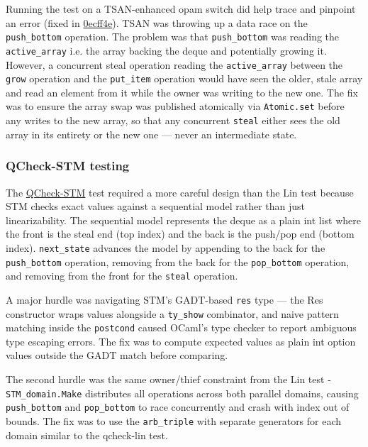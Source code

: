 \documentclass[11pt,a4paper]{article}
\begin{document}
Running the test on a TSAN-enhanced opam switch did help trace and pinpoint
an error (fixed in
\href{https://github.com/alinab/work-steal/commit/0ecff4ee7f97eeefe058dd971ea520606c0c3190}{0ecff4e}).
TSAN was throwing up a data race on the \texttt{push\_bottom} operation. The problem
was that \texttt{push\_bottom} was reading the \texttt{active\_array}
i.e. the array backing the deque and potentially growing it. However, a
concurrent steal operation reading the \texttt{active\_array} between the
\texttt{grow} operation and the \texttt{put\_item} operation would have seen
the older, stale array and read an element from it while the owner
was writing to the new one. The fix was to ensure the array swap was published
atomically via \texttt{Atomic.set} before any writes to the new array, so that any
concurrent \texttt{steal} either sees the old array in its entirety or the
new one — never an intermediate state.

\subsubsection{QCheck-STM testing}

The
\href{https://github.com/alinab/work-steal/commit/6b7536c3ec8f2ec3a34c674229e4d45de016bda4}
{QCheck-STM} test required a more careful design than the Lin test because
STM checks exact values against a sequential model rather than just
linearizability. The sequential model represents the deque as a plain int list
where the front is the steal end (top index) and the back is the push/pop end
(bottom index). \texttt{next\_state} advances the model by appending to the
back for the \texttt{push\_bottom} operation, removing from the back for the
\texttt{pop\_bottom} operation, and removing from the front for the
\texttt{steal} operation.

A major hurdle was navigating STM's GADT-based \texttt{res} type — the Res
constructor wraps values alongside a \texttt{ty\_show} combinator, and naive pattern
matching inside the \texttt{postcond} caused OCaml's type checker to report ambiguous
type escaping errors. The fix was to compute expected values as plain int option
values outside the GADT match before comparing.

The second hurdle was the same owner/thief constraint from the Lin test -
\texttt{STM\_domain.Make} distributes all operations across both parallel domains,
causing \texttt{push\_bottom} and \texttt{pop\_bottom} to race concurrently
and crash with index out of bounds. The fix was to use the \texttt{arb\_triple}
with separate generators for each domain similar to the qcheck-lin test.
\end{document}
